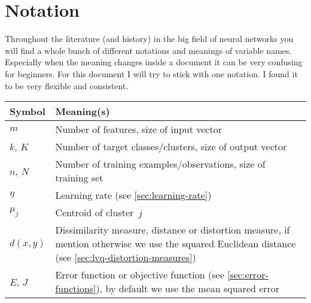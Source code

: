 \section{Notation}\label{sec:notation}
Throughout the literature (and history) in the big field of neural networks you will find a whole bunch of different notations and meanings of variable names. Especially when the meaning changes inside a document it can be very confusing for beginners. For this document I will try to stick with one notation. I found it to be very flexible and consistent.

\begin{tabularx}{\textwidth}{ l X }
Symbol			& Meaning(s) \\ \midrule
$m$				& Number of features, size of input vector \\
$k$, $K$		& Number of target classes/clusters, size of output vector \\
$n$, $N$		& Number of training examples/observations, size of training set \\
$\eta$			& Learning rate (see \ref{sec:learning-rate}) \\

\midrule %
$\mu_j$			& Centroid of cluster~$j$ \\
$d(x, y)$		& Dissimilarity measure, distance or distortion measure, if mention otherwise we use the squared Euclidean distance (see \ref{sec:lvq-distortion-measures}) \\

$E$, $J$		& Error function or objective function (see \ref{sec:error-functions}), by default we use the mean squared error \\


\end{tabularx}
